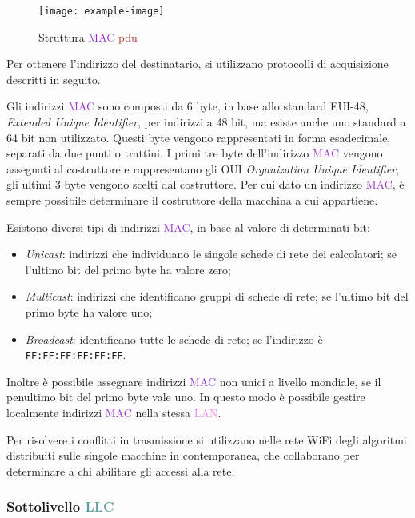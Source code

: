 \documentclass{article}
\numberwithin{equation}{subsection}
\begin{document}
\begin{figure}[H]%
    \centering%
    \texttt{[image: example-image]}%
    \caption{Struttura \textcolor{DarkOrchid}{MAC} \textcolor{Brown}{pdu}}%
\end{figure}

Per ottenere l'indirizzo del destinatario, si utilizzano protocolli di acquisizione descritti in seguito. 

Gli indirizzi \textcolor{DarkOrchid}{MAC} sono composti da 6 byte, in base allo standard EUI-48, \textit{Extended Unique Identifier}, per indirizzi a 48 bit, ma esiste anche uno standard a 64 bit non utilizzato. Questi byte vengono rappresentati in forma esadecimale, 
separati da due punti o trattini. I primi tre byte dell'indirizzo \textcolor{DarkOrchid}{MAC} vengono assegnati al costruttore e rappresentano gli OUI \textit{Organization Unique Identifier}, gli ultimi 3 byte vengono scelti dal costruttore. 
Per cui dato un indirizzo \textcolor{DarkOrchid}{MAC}, è sempre possibile determinare il costruttore della macchina a cui appartiene. 

Esistono diversi tipi di indirizzi \textcolor{DarkOrchid}{MAC}, in base al valore di determinati bit:
\begin{itemize}
    \item \textit{Unicast}: indirizzi che individuano le singole schede di rete dei calcolatori; se l'ultimo bit del primo byte ha valore zero;
    \item \textit{Multicast}: indirizzi che identificano gruppi di schede di rete; se l'ultimo bit del primo byte ha valore uno;
    \item \textit{Broadcast}: identificano tutte le schede di rete; se l'indirizzo è \texttt{FF:FF:FF:FF:FF:FF}.  
\end{itemize}

Inoltre è possibile assegnare indirizzi \textcolor{DarkOrchid}{MAC} non unici a livello mondiale, se il penultimo bit del primo byte vale uno. In questo modo è possibile gestire localmente indirizzi \textcolor{DarkOrchid}{MAC} nella stessa \textcolor{violet}{LAN}. 

Per risolvere i conflitti in trasmissione si utilizzano nelle rete \textcolor{Sepia}{WiFi} degli algoritmi distribuiti sulle singole macchine in contemporanea, che collaborano per determinare a chi abilitare gli accessi alla rete. 

\subsubsection{Sottolivello \textcolor{CadetBlue}{LLC}}
\end{document}
